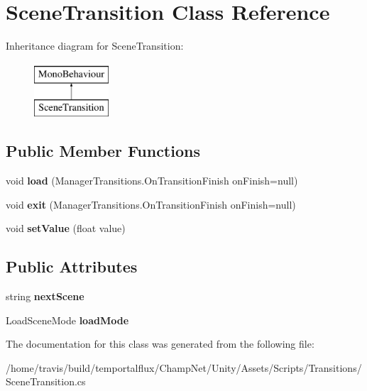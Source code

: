 \hypertarget{class_scene_transition}{\section{Scene\-Transition Class Reference}
\label{class_scene_transition}
}
Inheritance diagram for Scene\-Transition\-:\begin{figure}[H]
\begin{center}
\leavevmode
\includegraphics[height=2.000000cm]{class_scene_transition}
\end{center}
\end{figure}
\subsection*{Public Member Functions}
\begin{DoxyCompactItemize}
\item 
\hypertarget{class_scene_transition_ac0f7927206a866304c59c6f9d64db781}{void {\bfseries load} (Manager\-Transitions.\-On\-Transition\-Finish on\-Finish=null)}\label{class_scene_transition_ac0f7927206a866304c59c6f9d64db781}

\item 
\hypertarget{class_scene_transition_a1c56080a413a75527ecc5aaea65d5897}{void {\bfseries exit} (Manager\-Transitions.\-On\-Transition\-Finish on\-Finish=null)}\label{class_scene_transition_a1c56080a413a75527ecc5aaea65d5897}

\item 
\hypertarget{class_scene_transition_a1a720c2525f94d29e3bf9ec2fc3a2fee}{void {\bfseries set\-Value} (float value)}\label{class_scene_transition_a1a720c2525f94d29e3bf9ec2fc3a2fee}

\end{DoxyCompactItemize}
\subsection*{Public Attributes}
\begin{DoxyCompactItemize}
\item 
\hypertarget{class_scene_transition_a38658b7f48d29d07b9d79a9b77bbb4ee}{string {\bfseries next\-Scene}}\label{class_scene_transition_a38658b7f48d29d07b9d79a9b77bbb4ee}

\item 
\hypertarget{class_scene_transition_a5b140f4b742c3d71eaaedbee3a52a588}{Load\-Scene\-Mode {\bfseries load\-Mode}}\label{class_scene_transition_a5b140f4b742c3d71eaaedbee3a52a588}

\end{DoxyCompactItemize}


The documentation for this class was generated from the following file\-:\begin{DoxyCompactItemize}
\item 
/home/travis/build/temportalflux/\-Champ\-Net/\-Unity/\-Assets/\-Scripts/\-Transitions/Scene\-Transition.\-cs\end{DoxyCompactItemize}
